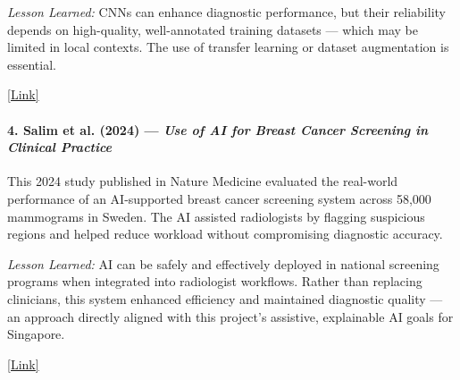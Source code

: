 \documentclass[12pt]{article}
\begin{document}
\textit{Lesson Learned:}
CNNs can enhance diagnostic performance, but their reliability depends on high-quality, well-annotated training datasets — which may be limited in local contexts. The use of transfer learning or dataset augmentation is essential.

\href{https://pubs.rsna.org/doi/10.1148/radiol.2019182716}{[Link]}

\vspace{0.5em}

\paragraph{4. Salim et al. (2024) — \textit{Use of AI for Breast Cancer Screening in Clinical Practice}}
This 2024 study published in Nature Medicine evaluated the real-world performance of an AI-supported breast cancer screening system across 58,000 mammograms in Sweden. The AI assisted radiologists by flagging suspicious regions and helped reduce workload without compromising diagnostic accuracy.

\textit{Lesson Learned:}
AI can be safely and effectively deployed in national screening programs when integrated into radiologist workflows. Rather than replacing clinicians, this system enhanced efficiency and maintained diagnostic quality — an approach directly aligned with this project's assistive, explainable AI goals for Singapore.

\href{https://www.nature.com/articles/s41591-024-03408-6}{[Link]}
\end{document}
